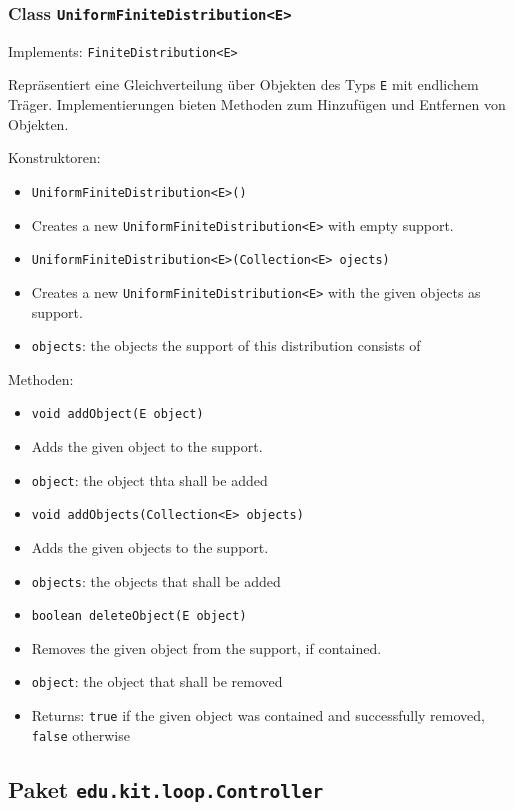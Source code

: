 \documentclass[parskip=full,11pt]{scrartcl}
\begin{document}
\subsubsection{Class \texttt{UniformFiniteDistribution<E>}}
Implements: \texttt{FiniteDistribution<E>}

Repräsentiert eine Gleichverteilung über Objekten des Typs \texttt{E} mit endlichem Träger. Implementierungen bieten Methoden zum Hinzufügen und Entfernen von Objekten.

Konstruktoren:
\begin{itemize}\itemsep -10pt
\item \texttt{UniformFiniteDistribution<E>()}
\item[] Creates a new \texttt{UniformFiniteDistribution<E>} with empty support.

\item \texttt{UniformFiniteDistribution<E>(Collection<E> ojects)}
\item[] Creates a new \texttt{UniformFiniteDistribution<E>} with the given objects as support.
\item[] \texttt{objects}: the objects the support of this distribution consists of
\end{itemize}

Methoden:
\begin{itemize}\itemsep -10pt
\item \texttt{void addObject(E object)}
\item[] Adds the given object to the support.
\item[] \texttt{object}: the object thta shall be added

\item \texttt{void addObjects(Collection<E> objects)}
\item[] Adds the given objects to the support.
\item[] \texttt{objects}: the objects that shall be added

\item \texttt{boolean deleteObject(E object)}
\item[] Removes the given object from the support, if contained.
\item[] \texttt{object}: the object that shall be removed
\item[] Returns: \texttt{true} if the given object was contained and successfully removed, \texttt{false} otherwise
\end{itemize}

\subsection{Paket \texttt{edu.kit.loop.Controller}}
\end{document}
